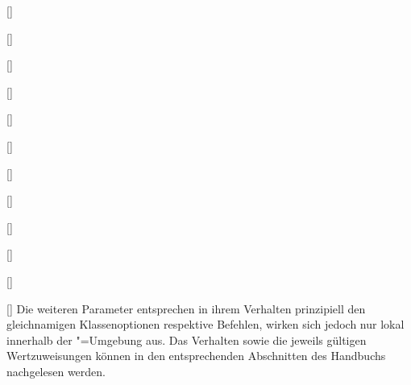 \begin{Declaration*}{}
\begin{Declaration*}{}
\begin{Declaration*}{}
\begin{Declaration}{[]}
\begin{Declaration}{[]}
\begin{Declaration}{[]}
\begin{Declaration}[v2.02]{[\PSet]}
\begin{Declaration}{[\PSet]}{%
}
\begin{Declaration}[v2.03]{[\PSet]}{%
}
\begin{Declaration}[v2.03]{[\PSet]}{%
}
\begin{Declaration}{[]}{%
}
\begin{Declaration}[v2.03]{%
  []
}{}
\begin{Declaration}[v2.02]{[\PSet]}{%
}
\begin{Declaration}[v2.02]{[\PSet]}{%
}
\begin{Declaration}[v2.02]{[\PSet]}{%
}
Die weiteren Parameter entsprechen in ihrem Verhalten prinzipiell den 
gleichnamigen Klassenoptionen respektive Befehlen, wirken sich jedoch nur lokal 
innerhalb der "=Umgebung aus. Das Verhalten sowie die 
jeweils gültigen Wertzuweisungen können in den entsprechenden Abschnitten des 
Handbuchs nachgelesen werden.
\end{Declaration}
\end{Declaration}
\end{Declaration}
\end{Declaration}
\end{Declaration}
\end{Declaration}
\end{Declaration}
\end{Declaration}
\end{Declaration}
\end{Declaration}
\end{Declaration}
\end{Declaration}
%



\end{Declaration*}
\end{Declaration*}
\end{Declaration*}
